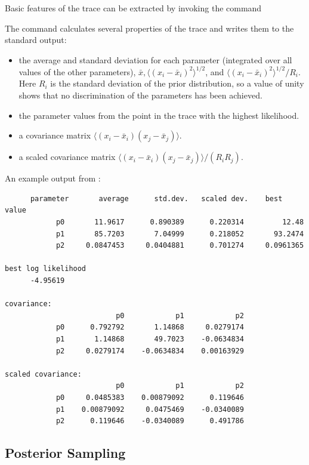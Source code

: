 Basic features of the trace can be extracted by invoking the command


The command calculates several properties of the trace and writes them to the standard output:
\begin{itemize}\itemsep=0pt
\item the average and standard deviation for each parameter (integrated over all values of the other parameters), $\bar{x},\langle(x_i-\bar{x}_i)^2\rangle^{1/2}$, and $\langle(x_i-\bar{x}_i)^2\rangle^{1/2}/R_i$.
Here $R_i$ is the standard deviation of the prior distribution, so a value of unity shows that no discrimination of the parameters has been achieved.
\item the parameter values from the point in the trace with the highest likelihood.
\item a covariance matrix $\langle (x_i-\bar{x}_i)(x_j-\bar{x}_j)\rangle$.
\item a scaled covariance matrix $\langle (x_i-\bar{x}_i)(x_j-\bar{x}_j)\rangle/(R_iR_j)$.
\end{itemize}

An example output from :
\begin{verbatim}
      parameter       average      std.dev.   scaled dev.    best value
            p0       11.9617      0.890389      0.220314         12.48
            p1       85.7203       7.04999      0.218052       93.2474
            p2     0.0847453     0.0404881      0.701274     0.0961365

best log likelihood
      -4.95619

covariance:
                          p0            p1            p2
            p0      0.792792       1.14868     0.0279174
            p1       1.14868       49.7023    -0.0634834
            p2     0.0279174    -0.0634834    0.00163929

scaled covariance:
                          p0            p1            p2
            p0     0.0485383    0.00879092      0.119646
            p1    0.00879092     0.0475469    -0.0340089
            p2      0.119646    -0.0340089      0.491786
\end{verbatim}

 \subsection{Posterior Sampling}\label{subsec:PosteriorSampling}

